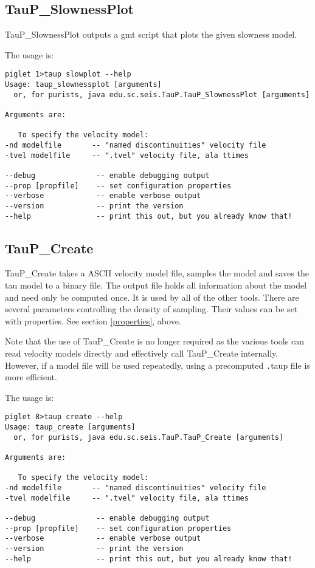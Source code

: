 \subsection{TauP\_SlownessPlot}

TauP\_SlownessPlot outputs a gmt script that plots the given slowness model.

The usage is:
\begin{verbatim}
piglet 1>taup slowplot --help
Usage: taup_slownessplot [arguments]
  or, for purists, java edu.sc.seis.TauP.TauP_SlownessPlot [arguments]

Arguments are:

   To specify the velocity model:
-nd modelfile       -- "named discontinuities" velocity file
-tvel modelfile     -- ".tvel" velocity file, ala ttimes

--debug              -- enable debugging output
--prop [propfile]    -- set configuration properties
--verbose            -- enable verbose output
--version            -- print the version
--help               -- print this out, but you already know that!
\end{verbatim}

\subsection{TauP\_Create}

TauP\_Create takes a ASCII velocity model file, samples the model
 and saves the tau model to a binary file.
The output file holds all
information about the model and need only be computed once. It
is used by all of the other tools. There are several parameters controlling
the density of sampling. Their values can be set with properties. See section
\ref{properties}, above.

Note that the use of TauP\_Create is no longer required as the various tools can read velocity models directly
and effectively call TauP\_Create internally. However, if a model file will be used repeatedly, using a
precomputed {\texttt .taup} file is more efficient.

The usage is:
\begin{verbatim}
piglet 8>taup create --help
Usage: taup_create [arguments]
  or, for purists, java edu.sc.seis.TauP.TauP_Create [arguments]

Arguments are:

   To specify the velocity model:
-nd modelfile       -- "named discontinuities" velocity file
-tvel modelfile     -- ".tvel" velocity file, ala ttimes

--debug              -- enable debugging output
--prop [propfile]    -- set configuration properties
--verbose            -- enable verbose output
--version            -- print the version
--help               -- print this out, but you already know that!
\end{verbatim}

